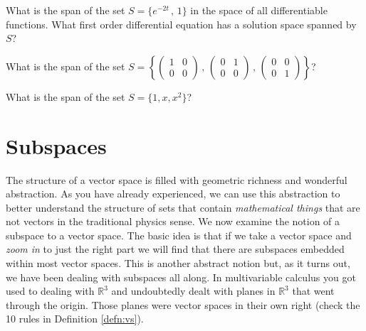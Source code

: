 \begin{problem}
    What is the span of the set $S = \{ e^{-2t} \, , \, 1 \}$ in the space of all
    differentiable functions. What first order differential equation has a solution space spanned by $S$?
\end{problem}

\begin{problem}
    What is the span of the set $S = \left\{ \begin{pmatrix} 1 & 0 \\ 0 & 0 \end{pmatrix}
    \, , \, \begin{pmatrix} 0 & 1 \\ 0 & 0 \end{pmatrix} \, , \, \begin{pmatrix} 0 & 0 \\
        0 & 1 \end{pmatrix} \right\}$?
\end{problem}

\begin{problem}
    What is the span of the set $S = \{1, x, x^2\}$?
\end{problem}



\newpage\section{Subspaces}
The structure of a vector space is filled with geometric richness and wonderful
abstraction.  As you have already experienced, we can use this abstraction to better
understand the structure of sets that contain {\it mathematical things} that are not
vectors in the traditional physics sense.  We now examine the notion of a subspace to a
vector space.  The basic idea is that if we take a vector space and {\it zoom in} to just
the right part we will find that there are subspaces embedded within most vector spaces.
This is another abstract notion but, as it turns out, we have been dealing with subspaces
all along.  In multivariable calculus you got used to dealing with $\mathbb{R}^3$ and
undoubtedly dealt with planes in $\mathbb{R}^3$ that went through the origin.  Those
planes were vector spaces in their own right (check the 10 rules in Definition
\ref{defn:vs}). 

